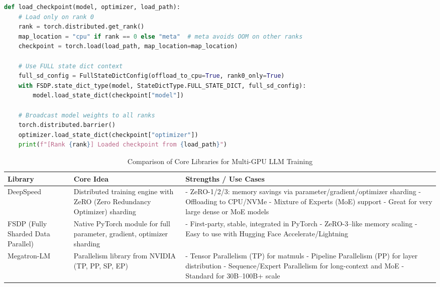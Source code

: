 \begin{lstlisting}[language=Python]
def load_checkpoint(model, optimizer, load_path):
    # Load only on rank 0
    rank = torch.distributed.get_rank()
    map_location = "cpu" if rank == 0 else "meta"  # meta avoids OOM on other ranks
    checkpoint = torch.load(load_path, map_location=map_location)

    # Use FULL state dict context
    full_sd_config = FullStateDictConfig(offload_to_cpu=True, rank0_only=True)
    with FSDP.state_dict_type(model, StateDictType.FULL_STATE_DICT, full_sd_config):
        model.load_state_dict(checkpoint["model"])

    # Broadcast model weights to all ranks
    torch.distributed.barrier()
    optimizer.load_state_dict(checkpoint["optimizer"])
    print(f"[Rank {rank}] Loaded checkpoint from {load_path}")
\end{lstlisting}

\begin{table}[h!]
\centering
\begin{tabular}{|p{2.5cm}|p{5cm}|p{6.5cm}|}
\hline
\textbf{Library} & \textbf{Core Idea} & \textbf{Strengths / Use Cases} \\
\hline
DeepSpeed & 
Distributed training engine with ZeRO (Zero Redundancy Optimizer) sharding & 
- ZeRO-1/2/3: memory savings via parameter/gradient/optimizer sharding \newline
- Offloading to CPU/NVMe \newline
- Mixture of Experts (MoE) support \newline
- Great for very large dense or MoE models \\
\hline
FSDP (Fully Sharded Data Parallel) & 
Native PyTorch module for full parameter, gradient, optimizer sharding & 
- First-party, stable, integrated in PyTorch \newline
- ZeRO-3–like memory scaling \newline
- Easy to use with Hugging Face Accelerate/Lightning \\
\hline
Megatron-LM & 
Parallelism library from NVIDIA (TP, PP, SP, EP) & 
- Tensor Parallelism (TP) for matmuls \newline
- Pipeline Parallelism (PP) for layer distribution \newline
- Sequence/Expert Parallelism for long-context and MoE \newline
- Standard for 30B–100B+ scale \\
\hline
\end{tabular}
\caption{Comparison of Core Libraries for Multi-GPU LLM Training}
\end{table}

